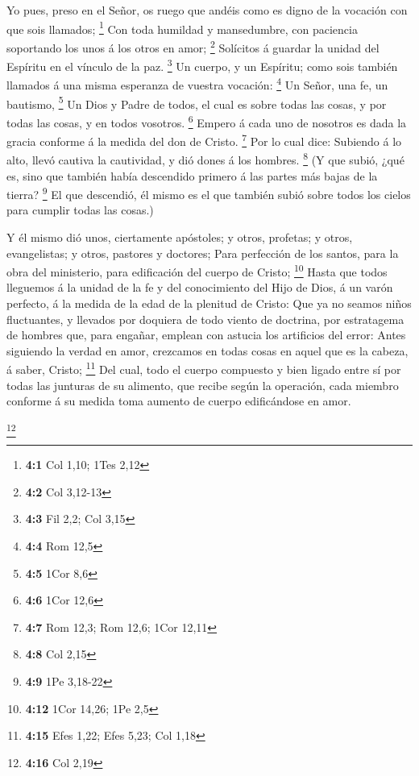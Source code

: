  Yo pues, preso en el Señor, os ruego que andéis como es
digno de la vocación con que sois llamados; \footnote{\textbf{4:1} Col
  1,10; 1Tes 2,12}  Con toda humildad y mansedumbre, con
paciencia soportando los unos á los otros en amor; \footnote{\textbf{4:2}
  Col 3,12-13}  Solícitos á guardar la unidad del Espíritu
en el vínculo de la paz. \footnote{\textbf{4:3} Fil 2,2; Col 3,15}
 Un cuerpo, y un Espíritu; como sois también llamados á
una misma esperanza de vuestra vocación: \footnote{\textbf{4:4} Rom 12,5}
 Un Señor, una fe, un bautismo, \footnote{\textbf{4:5}
  1Cor 8,6}  Un Dios y Padre de todos, el cual es sobre
todas las cosas, y por todas las cosas, y en todos vosotros. \footnote{\textbf{4:6}
  1Cor 12,6}  Empero á cada uno de nosotros es dada la
gracia conforme á la medida del don de Cristo. \footnote{\textbf{4:7}
  Rom 12,3; Rom 12,6; 1Cor 12,11}  Por lo cual dice:
Subiendo á lo alto, llevó cautiva la cautividad, y dió dones á los
hombres. \footnote{\textbf{4:8} Col 2,15}  (Y que subió,
¿qué es, sino que también había descendido primero á las partes más
bajas de la tierra? \footnote{\textbf{4:9} 1Pe 3,18-22} 
El que descendió, él mismo es el que también subió sobre todos los
cielos para cumplir todas las cosas.)

 Y él mismo dió unos, ciertamente apóstoles; y otros,
profetas; y otros, evangelistas; y otros, pastores y doctores;
 Para perfección de los santos, para la obra del
ministerio, para edificación del cuerpo de Cristo; \footnote{\textbf{4:12}
  1Cor 14,26; 1Pe 2,5}  Hasta que todos lleguemos á la
unidad de la fe y del conocimiento del Hijo de Dios, á un varón
perfecto, á la medida de la edad de la plenitud de Cristo:
 Que ya no seamos niños fluctuantes, y llevados por
doquiera de todo viento de doctrina, por estratagema de hombres que,
para engañar, emplean con astucia los artificios del error:
 Antes siguiendo la verdad en amor, crezcamos en todas
cosas en aquel que es la cabeza, á saber, Cristo; \footnote{\textbf{4:15}
  Efes 1,22; Efes 5,23; Col 1,18}  Del cual, todo el
cuerpo compuesto y bien ligado entre sí por todas las junturas de su
alimento, que recibe según la operación, cada miembro conforme á su
medida toma aumento de cuerpo edificándose en amor.

\footnote{\textbf{4:16} Col 2,19}

